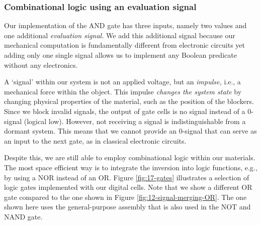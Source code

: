 \subsubsection{Combinational logic using an evaluation signal}
\label{section:digital-gates}

Our implementation of the AND gate has three inputs, namely two values and one additional \textit{evaluation signal.} We add this additional signal because our mechanical computation is fundamentally different from electronic circuits yet adding only one single signal allows us to implement any Boolean predicate without any electronics. 

A `signal' within our system is not an applied voltage, but an \textit{impulse,} i.e., a mechanical force within the object. This impulse \textit{changes the system state} by changing physical properties of the material, such as the position of the blockers. Since we block invalid signals, the output of gate cells is no signal instead of a 0-signal (logical low). However, not receiving a signal is indistinguishable from a dormant system. This means that we cannot provide an 0-signal that can serve as an input to the next gate, as in classical electronic circuits.

Despite this, we are still able to employ combinational logic within our materials. The most space efficient way is to integrate the inversion into logic functions, e.g., by using a NOR instead of an OR. Figure \ref{fig:17-gates} illustrates a selection of logic gates implemented with our digital cells. Note that we show a different OR gate compared to the one shown in Figure \ref{fig:12-signal-merging-OR}. The one shown here uses the general-purpose assembly that is also used in the NOT and NAND gate. 

